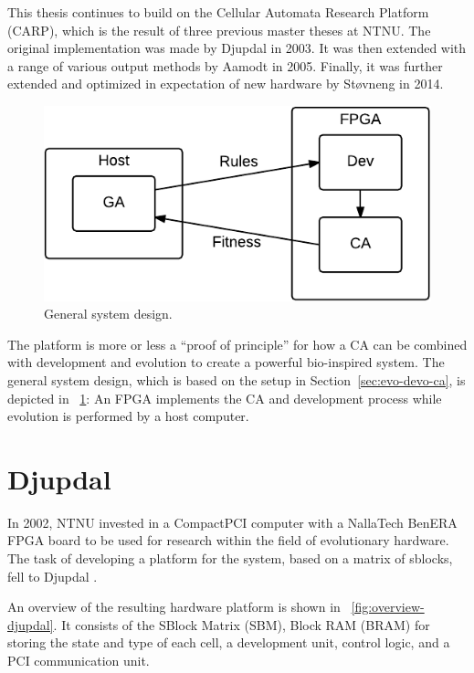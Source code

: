 This thesis continues to build on the Cellular Automata Research Platform (CARP), which is the result of three previous master theses at NTNU.
The original implementation was made by Djupdal in 2003.
It was then extended with a range of various output methods by Aamodt in 2005.
Finally, it was further extended and optimized in expectation of new hardware by Støvneng in 2014.

\begin{figure}[!ht]
    \centering
    \includegraphics[width=28\block]{figures/overview-general}
    \caption[System design]{
        General system design.
    }
    \label{fig:overview-general}
\end{figure}

The platform is more or less a ``proof of principle'' for how a CA can be combined with development and evolution to create a powerful bio-inspired system.
The general system design, which is based on the setup in Section~\ref{sec:evo-devo-ca}, is depicted in \figurename~\ref{fig:overview-general}:
An FPGA implements the CA and development process while evolution is performed by a host computer.


\section{Djupdal}

In 2002, NTNU invested in a CompactPCI computer with a NallaTech BenERA FPGA board to be used for research within the field of evolutionary hardware.
The task of developing a platform for the system, based on a matrix of sblocks, fell to Djupdal \cite{djupdal2003sblock}.

An overview of the resulting hardware platform is shown in \figurename~\ref{fig:overview-djupdal}.
It consists of the SBlock Matrix (SBM), Block RAM (BRAM) for storing the state and type of each cell, a development unit, control logic, and a PCI communication unit.

